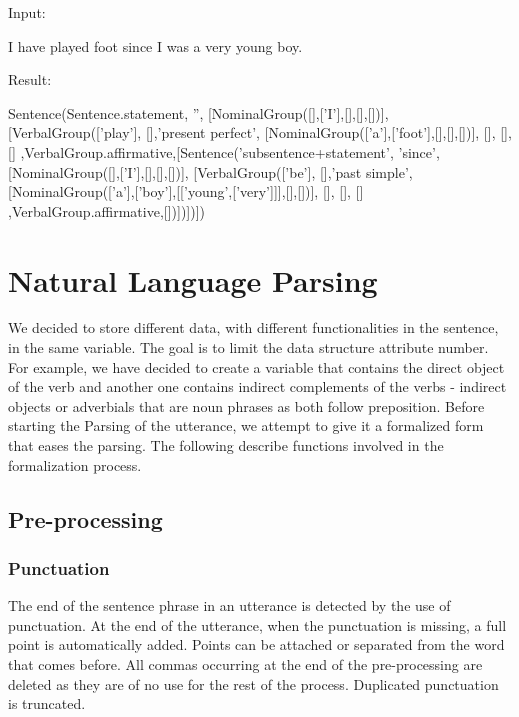 \documentclass[twoside,a4paper,10pt]{report}
\begin{document}
Input:


\small
\begin{verbatimtab}
I have played foot since I was a very young boy.
\end{verbatimtab}
\normalsize
Result:


\small
\begin{verbatimtab}
  Sentence(Sentence.statement, '', 
      [NominalGroup([],['I'],[],[],[])], 
      [VerbalGroup(['play'], [],'present perfect', 
          [NominalGroup(['a'],['foot'],[],[],[])], 
          [],
          [], [] ,VerbalGroup.affirmative,[Sentence('subsentence+statement', 'since', 
              [NominalGroup([],['I'],[],[],[])], 
              [VerbalGroup(['be'], [],'past simple', 
                  [NominalGroup(['a'],['boy'],[['young',['very']]],[],[])], 
                  [],
                  [], [] ,VerbalGroup.affirmative,[])])])])
\end{verbatimtab}
\normalsize

\chapter{Natural Language Parsing}
\label{40b6d909561b858c733e07e5b7595576}%
We decided to store different data, with different functionalities in the sentence, in the same variable. The goal is to limit the data structure attribute number.
For example, we have decided to create a variable that contains the direct object of the verb and another one contains indirect complements of the verbs - indirect objects or adverbials that are noun phrases as both follow preposition.
Before starting the Parsing of the utterance, we attempt to give it a formalized form that eases the parsing. The following describe functions involved in the formalization process.


\section{Pre-processing}
\label{786dd9bb7bc5625a566d42a2962bebf7}%

\subsection{Punctuation}
\label{9ac6d441030eb0844ffb83ba4f100c94}%
The end of the sentence phrase in an utterance is detected by the use of punctuation. At the end of the utterance, when the punctuation is missing, a full point is automatically added. Points can be attached or separated from the word that comes before.
All commas occurring at the end of the pre-processing are deleted as they are of no use for the rest of the process.
Duplicated punctuation is truncated.
\end{document}
